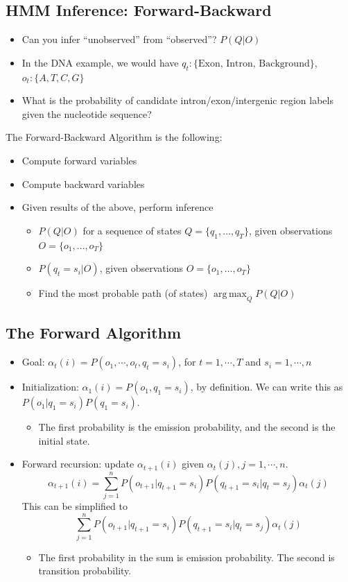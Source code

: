 \documentclass[10pt]{article}
\DeclareMathOperator*{\argmax}{arg\,max}
\begin{document}
\subsection*{HMM Inference: Forward-Backward}
\begin{itemize}
	\item Can you infer ``unobserved'' from ``observed''?  $P(Q | O)$
	\item In the DNA example, we would have $q_t: \{\text{Exon, Intron, Background}\}$, $o_t: \{A, T, C, G\}$
	\item What is the probability of candidate intron/exon/intergenic region labels given the nucleotide sequence?
\end{itemize}
The Forward-Backward Algorithm is the following:
\begin{itemize}
	\item Compute forward variables
	\item Compute backward variables
	\item Given results of the above, perform inference
	\begin{itemize}
	    \item $P(Q | O)$ for a sequence of states $Q = \{q_1, \dots, q_T\}$, given observations $O = \{o_1, \dots, o_T\}$
	    \item $P(q_t = s_i | O)$, given observations $O = \{o_1, \dots, o_T\}$
	    \item Find the most probable path (of states) $\argmax_Q P(Q | O)$
    \end{itemize}
\end{itemize}

\subsection*{The Forward Algorithm}
\begin{itemize}
	\item Goal: $\alpha_t(i) = P(o_1, \cdots, o_t, q_t = s_i)$, for $t = 1, \cdots, T$ and $s_i = 1, \cdots, n$
	\item Initialization: $\alpha_1(i) = P(o_1, q_1 = s_i)$, by definition.  We can write this as $P(o_1 | q_1 = s_i) P(q_1 = s_i)$.
	\begin{itemize}
	    \item The first probability is the emission probability, and the second is the initial state.
    \end{itemize}
	\item Forward recursion: update $\alpha_{t + 1}(i)$ given $\alpha_t(j), j = 1, \cdots, n$.
	\[\alpha_{t + 1}(i) = \sum_{j = 1}^n P(o_{t + 1} | q_{t + 1} = s_i) P(q_{t + 1} = s_i | q_t = s_j) \alpha_t(j)\]
    This can be simplified to
    \[\sum_{j = 1}^n P(o_{t + 1} | q_{t + 1} = s_i) P(q_{t + 1} = s_i | q_t = s_j) \alpha_t(j)\]
    \begin{itemize}
	    \item The first probability in the sum is emission probability.  The second is transition probability.
    \end{itemize}
\end{itemize}
\end{document}
